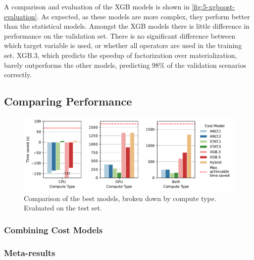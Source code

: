 A comparison and evaluation of the XGB models is shown in \autoref{fig:5-xgboost-evaluation}. As expected, as these models are more complex, they perform better than the statistical models. Amongst the XGB models there is little difference in performance on the validation set. There is no significant difference between which target variable is used, or whether all operators are used in the training set. XGB.3, which predicts the speedup of factorization over materialization, barely outperforms the other models, predicting 98\% of the validation scenarios correctly.

\subsection{Comparing Performance}

\begin{figure}[ht]
    \centering
    \includegraphics[width=0.9\linewidth]{chapters/05_cost_estimation/figures/compare_gpu_vs_cpu.pdf}
    \caption[Cost Model Comparison Broken Down by Compute Type]{Comparison of the best models, broken down by compute type. Evaluated on the test set.}
    \label{fig:5-model-cpu-gpu}
\end{figure}

\subsubsection{Combining Cost Models}


\subsubsection{Meta-results}

